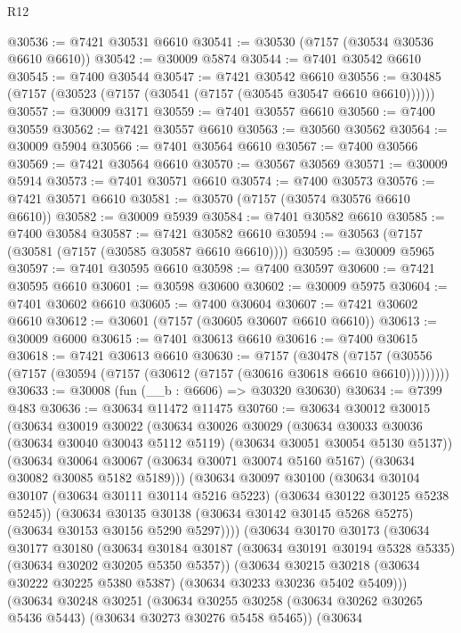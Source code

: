 \begin{lexlean}{R12}
\begin{coremodule}
@30536 := @7421 @30531 @6610
@30541 := @30530 (@7157 (@30534 @30536 @6610 @6610))
@30542 := @30009 @5874
@30544 := @7401 @30542 @6610
@30545 := @7400 @30544
@30547 := @7421 @30542 @6610
@30556 := @30485 (@7157 (@30523 (@7157 (@30541 (@7157 (@30545 @30547 @6610 @6610))))))
@30557 := @30009 @3171
@30559 := @7401 @30557 @6610
@30560 := @7400 @30559
@30562 := @7421 @30557 @6610
@30563 := @30560 @30562
@30564 := @30009 @5904
@30566 := @7401 @30564 @6610
@30567 := @7400 @30566
@30569 := @7421 @30564 @6610
@30570 := @30567 @30569
@30571 := @30009 @5914
@30573 := @7401 @30571 @6610
@30574 := @7400 @30573
@30576 := @7421 @30571 @6610
@30581 := @30570 (@7157 (@30574 @30576 @6610 @6610))
@30582 := @30009 @5939
@30584 := @7401 @30582 @6610
@30585 := @7400 @30584
@30587 := @7421 @30582 @6610
@30594 := @30563 (@7157 (@30581 (@7157 (@30585 @30587 @6610 @6610))))
@30595 := @30009 @5965
@30597 := @7401 @30595 @6610
@30598 := @7400 @30597
@30600 := @7421 @30595 @6610
@30601 := @30598 @30600
@30602 := @30009 @5975
@30604 := @7401 @30602 @6610
@30605 := @7400 @30604
@30607 := @7421 @30602 @6610
@30612 := @30601 (@7157 (@30605 @30607 @6610 @6610))
@30613 := @30009 @6000
@30615 := @7401 @30613 @6610
@30616 := @7400 @30615
@30618 := @7421 @30613 @6610
@30630 := @7157
    (@30478 (@7157 (@30556 (@7157 (@30594 (@7157 (@30612 (@7157 (@30616 @30618 @6610 @6610)))))))))
@30633 := @30008 (fun (__b : @6606) => @30320 @30630)
@30634 := @7399 @483
@30636 := @30634 @11472 @11475
@30760 := @30634
    @30012
    @30015
    (@30634
      @30019
      @30022
      (@30634
        @30026
        @30029
        (@30634 @30033 @30036 (@30634 @30040 @30043 @5112 @5119) (@30634 @30051 @30054 @5130 @5137))
        (@30634
          @30064
          @30067
          (@30634 @30071 @30074 @5160 @5167)
          (@30634 @30082 @30085 @5182 @5189)))
      (@30634
        @30097
        @30100
        (@30634 @30104 @30107 (@30634 @30111 @30114 @5216 @5223) (@30634 @30122 @30125 @5238 @5245))
        (@30634
          @30135
          @30138
          (@30634 @30142 @30145 @5268 @5275)
          (@30634 @30153 @30156 @5290 @5297))))
    (@30634
      @30170
      @30173
      (@30634
        @30177
        @30180
        (@30634 @30184 @30187 (@30634 @30191 @30194 @5328 @5335) (@30634 @30202 @30205 @5350 @5357))
        (@30634
          @30215
          @30218
          (@30634 @30222 @30225 @5380 @5387)
          (@30634 @30233 @30236 @5402 @5409)))
      (@30634
        @30248
        @30251
        (@30634 @30255 @30258 (@30634 @30262 @30265 @5436 @5443) (@30634 @30273 @30276 @5458 @5465))
        (@30634

\end{coremodule}
\end{lexlean}
